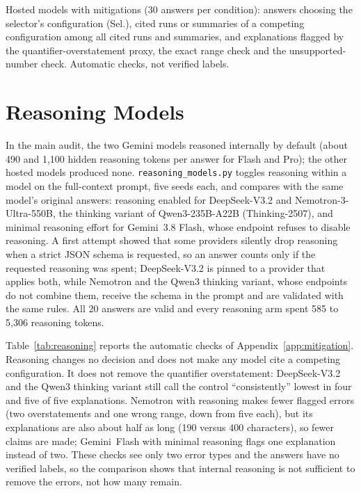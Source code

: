 \begin{table}[h]
\centering\footnotesize\setlength{\tabcolsep}{3pt}
\caption{Hosted models with mitigations (30 answers per condition): answers choosing the selector's configuration (Sel.), cited runs or summaries of a competing configuration among all cited runs and summaries, and explanations flagged by the quantifier-overstatement proxy, the exact range check and the unsupported-number check. Automatic checks, not verified labels.}
\label{tab:mitigation}
\begin{adjustbox}{max width=\columnwidth}

\end{adjustbox}
\end{table}

\section{Reasoning Models}
\label{app:reasoning}
In the main audit, the two Gemini models reasoned internally by default (about 490 and 1,100 hidden reasoning tokens per answer for Flash and Pro); the other hosted models produced none. \texttt{reasoning\_models.py} toggles reasoning within a model on the full-context prompt, five seeds each, and compares with the same model's original answers: reasoning enabled for DeepSeek-V3.2 and Nemotron-3-Ultra-550B, the thinking variant of Qwen3-235B-A22B (Thinking-2507), and minimal reasoning effort for Gemini~3.8 Flash, whose endpoint refuses to disable reasoning. A first attempt showed that some providers silently drop reasoning when a strict JSON schema is requested, so an answer counts only if the requested reasoning was spent; DeepSeek-V3.2 is pinned to a provider that applies both, while Nemotron and the Qwen3 thinking variant, whose endpoints do not combine them, receive the schema in the prompt and are validated with the same rules. All 20 answers are valid and every reasoning arm spent 585 to 5,306 reasoning tokens.

Table~\ref{tab:reasoning} reports the automatic checks of Appendix~\ref{app:mitigation}. Reasoning changes no decision and does not make any model cite a competing configuration. It does not remove the quantifier overstatement: DeepSeek-V3.2 and the Qwen3 thinking variant still call the control ``consistently'' lowest in four and five of five explanations. Nemotron with reasoning makes fewer flagged errors (two overstatements and one wrong range, down from five each), but its explanations are also about half as long (190 versus 400 characters), so fewer claims are made; Gemini~Flash with minimal reasoning flags one explanation instead of two. These checks see only two error types and the answers have no verified labels, so the comparison shows that internal reasoning is not sufficient to remove the errors, not how many remain.

